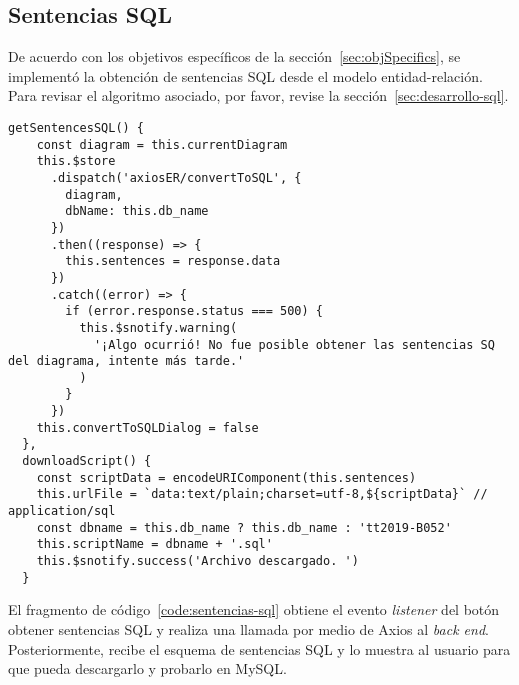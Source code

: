 \subsection{Sentencias SQL}
De acuerdo con los objetivos específicos de la sección~\ref{sec:objSpecifics}, se implementó la obtención de sentencias SQL desde el modelo entidad-relación. Para revisar el algoritmo asociado, por favor, revise la sección~\ref{sec:desarrollo-sql}. 
\begin{code}
    \label{code:sentencias-sql}
    \begin{verbatim}
getSentencesSQL() {
    const diagram = this.currentDiagram
    this.$store
      .dispatch('axiosER/convertToSQL', {
        diagram,
        dbName: this.db_name
      })
      .then((response) => {
        this.sentences = response.data
      })
      .catch((error) => {
        if (error.response.status === 500) {
          this.$snotify.warning(
            '¡Algo ocurrió! No fue posible obtener las sentencias SQ del diagrama, intente más tarde.'
          )
        }
      })
    this.convertToSQLDialog = false
  },
  downloadScript() {
    const scriptData = encodeURIComponent(this.sentences)
    this.urlFile = `data:text/plain;charset=utf-8,${scriptData}` // application/sql
    const dbname = this.db_name ? this.db_name : 'tt2019-B052'
    this.scriptName = dbname + '.sql'
    this.$snotify.success('Archivo descargado. ')
  }

\end{verbatim}
\end{code}


El fragmento de código~\ref{code:sentencias-sql} obtiene el evento \textit{listener} del botón obtener sentencias SQL y realiza una llamada por medio de Axios al \textit{back end}. Posteriormente, recibe el esquema de sentencias SQL y lo muestra al usuario para que pueda descargarlo y probarlo en MySQL.